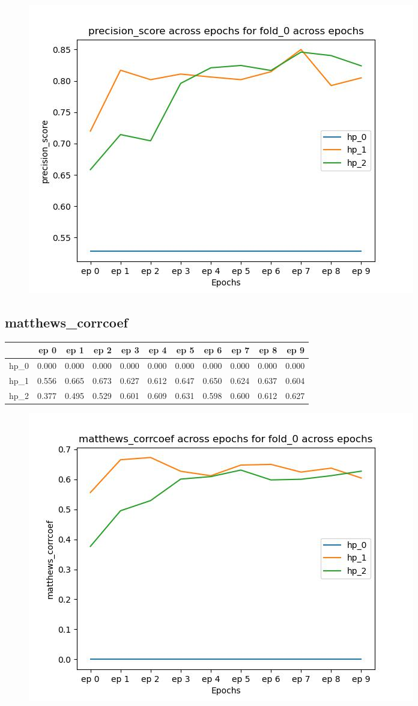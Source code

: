 \documentclass{article}
\begin{document}
\begin{figure}[H]
\includegraphics[scale = 0.75]{fold_0/precision_score}
\end{figure}
\subsection{matthews\_corrcoef}
\begin{tabular}{lrrrrrrrrrr}
\toprule
{} &   ep 0 &   ep 1 &   ep 2 &   ep 3 &   ep 4 &   ep 5 &   ep 6 &   ep 7 &   ep 8 &   ep 9 \\
\midrule
hp\_0 &  0.000 &  0.000 &  0.000 &  0.000 &  0.000 &  0.000 &  0.000 &  0.000 &  0.000 &  0.000 \\
hp\_1 &  0.556 &  0.665 &  0.673 &  0.627 &  0.612 &  0.647 &  0.650 &  0.624 &  0.637 &  0.604 \\
hp\_2 &  0.377 &  0.495 &  0.529 &  0.601 &  0.609 &  0.631 &  0.598 &  0.600 &  0.612 &  0.627 \\
\bottomrule
\end{tabular}

\begin{figure}[H]
\includegraphics[scale = 0.75]{fold_0/matthews_corrcoef}
\end{figure}
\end{document}
